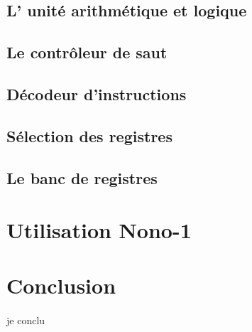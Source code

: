 \documentclass[a4paper]{article}
\begin{document}
		\subsection{L' unité arithmétique et logique}
			
		\subsection{Le contrôleur de saut}
			
		\subsection{Décodeur d'instructions}
			
		\subsection{Sélection des registres}
			
		\subsection{Le banc de registres}
			
		
	\section{Utilisation Nono-1}

	
	
	\section*{Conclusion}
		\paragraph{}{je conclu}
		
\end{document}
